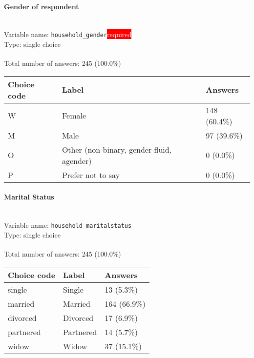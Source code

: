 \documentclass[11.5pt, a4paper]{scrartcl}
\begin{document}
\paragraph{Gender of respondent}
\  \\Variable name: \texttt{household\_gender}\hfill\colorbox{red}{\small{\textcolor{white}{required}}}\\
 Type: single choice\\
\\Total number of answers: 245 (100.0\%)
\\[0.2em] \begin{tabular}{p{4cm}|p{8cm}|p{3cm}}
Choice code & Label & Answers \\
\hline
W & Female& \cellcolor{color3}148 (60.4\%)\\
\cellcolor{mygray} M & \cellcolor{mygray}Male & \cellcolor{color1}97 (39.6\%)\\
O & Other (non-binary, gender-fluid, agender)& \cellcolor{color0}0 (0.0\%)\\
\cellcolor{mygray} P & \cellcolor{mygray}Prefer not to say & \cellcolor{color0}0 (0.0\%)\\
\end{tabular}
\paragraph{Marital Status}
\  \\Variable name: \texttt{household\_maritalstatus}\\
Type: single choice\\
\\Total number of answers: 245 (100.0\%)
\\[0.2em] \begin{tabular}{p{4cm}|p{8cm}|p{3cm}}
Choice code & Label & Answers \\
\hline
single & Single& \cellcolor{color0}13 (5.3\%)\\
\cellcolor{mygray} married & \cellcolor{mygray}Married  & \cellcolor{color3}164 (66.9\%)\\
divorced & Divorced& \cellcolor{color0}17 (6.9\%)\\
\cellcolor{mygray} partnered & \cellcolor{mygray}Partnered & \cellcolor{color0}14 (5.7\%)\\
widow & Widow& \cellcolor{color0}37 (15.1\%)\\
\end{tabular}
\end{document}
